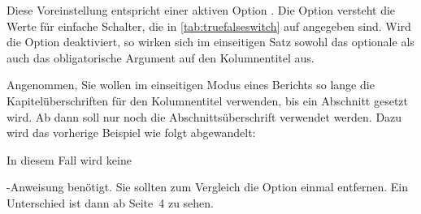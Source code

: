    Diese Voreinstellung entspricht einer aktiven Option
  . Die Option versteht
  die Werte für einfache Schalter, die in \autoref{tab:truefalseswitch} auf
   angegeben sind. Wird die Option
  deaktiviert, so wirken sich im einseitigen Satz sowohl das optionale als
  auch das obligatorische Argument auf den Kolumnentitel aus.%
  \IfThisCommonLabelBase{scrlayer-scrpage}{\iftrue}{\csname
    iffalse\endcsname}%
    \begin{Example}
      Angenommen, Sie wollen im einseitigen Modus eines Berichts %
      \iffalse %
      eine ganz ähnliche Verwendung des Kolumnentitels erreichen wie im
      vorherigen Beispiel. Konkret soll so lange die Kapitelüberschrift
      verwendet werden, %
      \else %
      so lange die Kapitelüberschriften für den Kolumnentitel verwenden, %
      \fi %
      bis ein Abschnitt gesetzt wird. Ab dann soll nur noch die
      Abschnittsüberschrift verwendet werden. %
      \iftrue %
      Dazu wird das %
      \iftrue vorherige \fi %
      Beispiel wie folgt abgewandelt:%
      \fi %
      \iffalse %
      Wie zu sehen ist, wird in diesem Fall keine %
      \else %
      In diesem Fall wird keine %
      \fi
      \iffalse ergänzende \fi %
      -Anweisung benötigt. Sie sollten zum
      Vergleich die Option  %
      \iffalse auch \fi %
      einmal %
      \iffalse auf \PValue{true} setzen oder sie \fi %
      entfernen. Ein Unterschied ist dann ab Seite~4 %
      \iffalse im Kolumnentitel im Kopf der Seiten \fi %
      zu sehen.
    \end{Example}
  \fi

